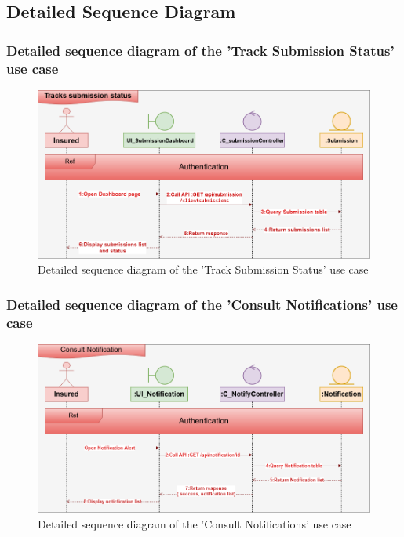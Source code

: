 \subsection{Detailed Sequence Diagram}
\subsubsection{Detailed sequence diagram of the 'Track Submission Status' use case}
\begin{figure}[h!]
    \centering
    \includegraphics[width=1\textwidth]{figures/det Tracks submission status.png}
    \caption{Detailed sequence diagram of the 'Track Submission Status' use case}
\end{figure}
\subsubsection{Detailed sequence diagram of the 'Consult Notifications' use case}
\begin{figure}[h!]
    \centering
    \includegraphics[width=1\textwidth]{figures/det consult notification.png}
    \caption{Detailed sequence diagram of the 'Consult Notifications' use case}
\end{figure}
\clearpage

